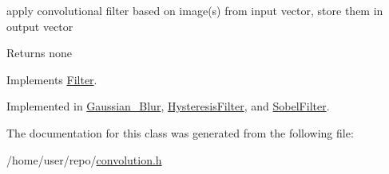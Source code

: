 apply convolutional filter based on image(s) from input vector, store them in output vector 

\begin{DoxyReturn}{Returns}
none 
\end{DoxyReturn}


Implements \hyperlink{classFilter_afab0d50af44a19a370ebe46c69b8ff4e}{Filter}.



Implemented in \hyperlink{classGaussian__Blur_aac260e4900fda92755855a6d52d1be0d}{Gaussian\+\_\+\+Blur}, \hyperlink{classHysteresisFilter_af2d6c50bc0cfd609fbf7e90f01b03b1f}{Hysteresis\+Filter}, and \hyperlink{classSobelFilter_a9c8136932e8d9c7cb7dd785cf9dbfefe}{Sobel\+Filter}.



The documentation for this class was generated from the following file\+:\begin{DoxyCompactItemize}
\item 
/home/user/repo/\hyperlink{convolution_8h}{convolution.\+h}\end{DoxyCompactItemize}
